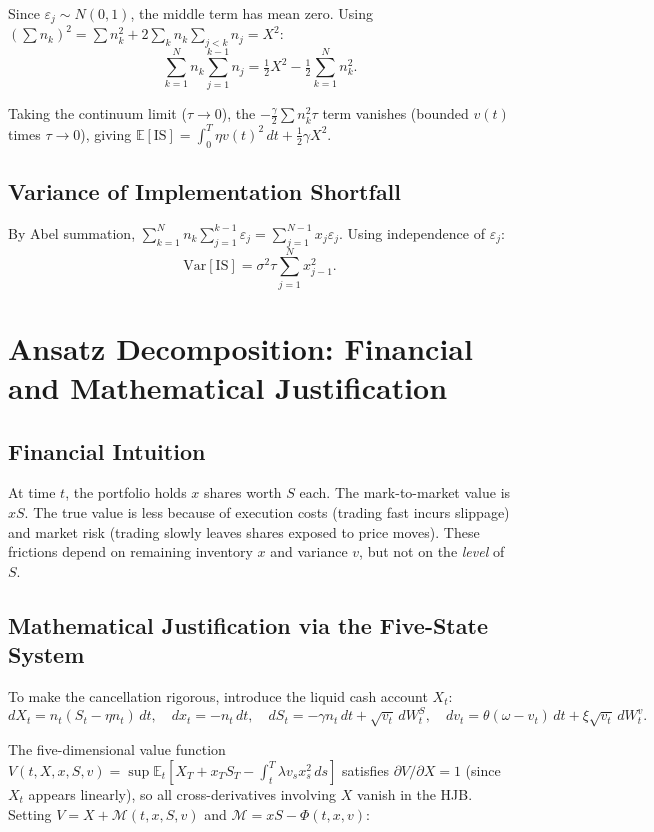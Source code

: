 \documentclass[11pt]{article}
\begin{document}
Since $\varepsilon_j\sim N(0,1)$, the middle term has mean zero.
Using $\left(\sum n_k\right)^2 = \sum n_k^2 + 2\sum_k n_k\sum_{j<k}n_j = X^2$:
\[
\sum_{k=1}^Nn_k\sum_{j=1}^{k-1}n_j = \tfrac{1}{2}X^2 - \tfrac{1}{2}\sum_{k=1}^Nn_k^2.
\]

Taking the continuum limit ($\tau\to 0$), the $-\frac{\gamma}{2}\sum n_k^2\tau$ term vanishes
(bounded $v(t)$ times $\tau\to 0$), giving
$\mathbb{E}[\mathrm{IS}] = \int_0^T \eta v(t)^2\,dt + \frac{1}{2}\gamma X^2$.

\subsection{Variance of Implementation Shortfall}

By Abel summation, $\sum_{k=1}^N n_k \sum_{j=1}^{k-1}\varepsilon_j = \sum_{j=1}^{N-1}x_j\varepsilon_j$.
Using independence of $\varepsilon_j$:
\[
\mathrm{Var}[\mathrm{IS}] = \sigma^2\tau\sum_{j=1}^N x_{j-1}^2.
\]

\section{Ansatz Decomposition: Financial and Mathematical Justification}
\label{app:ansatz}

\subsection{Financial Intuition}

At time $t$, the portfolio holds $x$ shares worth $S$ each.
The mark-to-market value is $xS$.
The true value is less because of execution costs (trading fast incurs slippage) and
market risk (trading slowly leaves shares exposed to price moves).
These frictions depend on remaining inventory $x$ and variance $v$, but not on the
\emph{level} of $S$.

\subsection{Mathematical Justification via the Five-State System}

To make the cancellation rigorous, introduce the liquid cash account $X_t$:
\[
dX_t = n_t(S_t - \eta n_t)\,dt,\quad
dx_t = -n_t\,dt,\quad
dS_t = -\gamma n_t\,dt + \sqrt{v_t}\,dW^S_t,\quad
dv_t = \theta(\omega-v_t)\,dt + \xi\sqrt{v_t}\,dW^v_t.
\]

The five-dimensional value function
$V(t,X,x,S,v) = \sup\mathbb{E}_t[X_T + x_T S_T - \int_t^T\lambda v_s x_s^2\,ds]$
satisfies $\partial V/\partial X = 1$ (since $X_t$ appears linearly),
so all cross-derivatives involving $X$ vanish in the HJB.
Setting $V = X + \mathcal{M}(t,x,S,v)$ and $\mathcal{M} = xS - \Phi(t,x,v)$:
\end{document}
